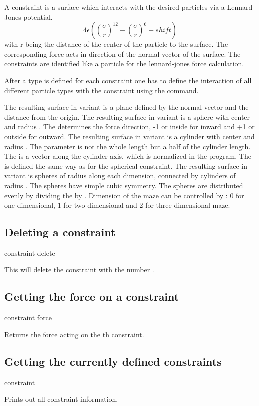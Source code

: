 A constraint is a surface which interacts with the desired particles
via a Lennard-Jones potential.
\[4 \epsilon \left(\left(\frac{\sigma}{r}\right)^{12} -
  \left(\frac{\sigma}{r}\right)^6 + shift\right)\] with r being the
distance of the center of the particle to the surface. The
corresponding force acts in direction of the normal vector of the
surface. The constraints are identified like a particle for the
lennard-jones force calculation. 

After a type is defined for each constraint one has to define the
interaction of all different particle types with the constraint using
the  command.

The resulting surface in variant  is a plane defined by the
normal vector    and the distance
 from the origin. The resulting surface in variant 
is a sphere with center    and radius
. The  determines the force direction, -1 or
inside for inward and +1 or outside for outward. The resulting surface
in variant  is a cylinder with center  
 and radius . The  parameter is not the
whole length but a half of the cylinder length. The  is a
vector along the cylinder axis, which is normalized in the program.
The  is defined the same way as for the spherical
constraint. The resulting surface in variant  is 
spheres of radius  along each dimension, connected by
cylinders of radius . The spheres have simple cubic
symmetry. The spheres are distributed evenly by dividing the
 by .  Dimension of the maze can be controlled by
: 0 for one dimensional, 1 for two dimensional and 2 for three
dimensional maze.


\subsection{Deleting a constraint}
\begin{essyntax}
  constraint delete  
\end{essyntax}

This will delete the constraint with the number .

\subsection{Getting the force on a constraint}
\begin{essyntax}
constraint force  
\end{essyntax}
Returns the force acting on the th constraint.


\subsection{Getting the currently defined constraints}
\begin{essyntax}
constraint 
\end{essyntax}
Prints out all constraint information.


